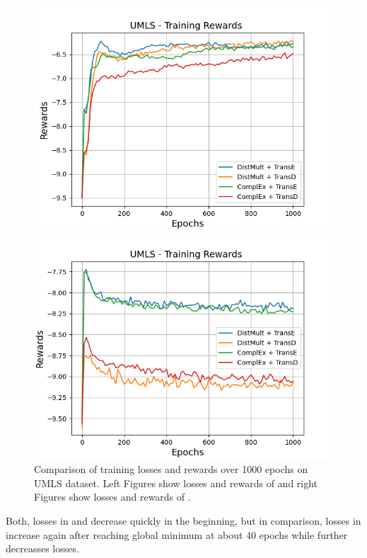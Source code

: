 \begin{figure}
\begin{minipage}{.5\textwidth}
      \includegraphics[width=0.9\linewidth]{figures/results/gan_train/not_pretrained/random/umls/epochs1000/random_umls_rew.png}
    \end{minipage}%
    \begin{minipage}{.5\textwidth}
      \centering
      \includegraphics[width=0.9\linewidth]{figures/results/gan_train/not_pretrained/uncertainty/max_distribution/entropy/umls/1k_epochs/uncertainty_umls_rew.png}
    \end{minipage}%
    \caption{Comparison of training losses and rewards over 1000 epochs on \textsc{UMLS} dataset.
    Left Figures show losses and rewards of \origsampling and right Figures show losses and rewards of \ussoftmax.}
    \label{fig:advtrain_umls_losses_rewards}
\end{figure}
Both, losses in \origsampling and \ussoftmax decrease quickly in the beginning, but in comparison, losses in \origsampling increase again after reaching global minimum at about 40 epochs while \ussoftmax further decreasses losses.

